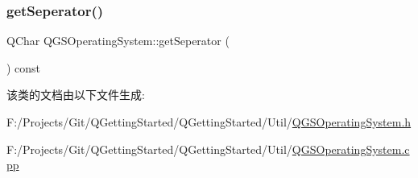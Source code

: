 \subsubsection{\texorpdfstring{get\+Seperator()}{getSeperator()}}
{\footnotesize\ttfamily Q\+Char Q\+G\+S\+Operating\+System\+::get\+Seperator (\begin{DoxyParamCaption}{ }\end{DoxyParamCaption}) const}



该类的文档由以下文件生成\+:\begin{DoxyCompactItemize}
\item 
F\+:/\+Projects/\+Git/\+Q\+Getting\+Started/\+Q\+Getting\+Started/\+Util/\mbox{\hyperlink{_q_g_s_operating_system_8h}{Q\+G\+S\+Operating\+System.\+h}}\item 
F\+:/\+Projects/\+Git/\+Q\+Getting\+Started/\+Q\+Getting\+Started/\+Util/\mbox{\hyperlink{_q_g_s_operating_system_8cpp}{Q\+G\+S\+Operating\+System.\+cpp}}\end{DoxyCompactItemize}
